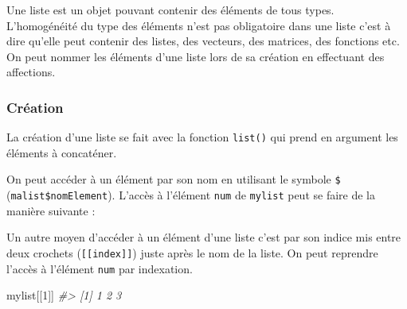 \documentclass[
]{book}
\newenvironment{Shaded}{\begin{snugshade}}{\end{snugshade}}
\newcommand{\AttributeTok}[1]{\textcolor[rgb]{0.77,0.63,0.00}{#1}}
\newcommand{\CommentTok}[1]{\textcolor[rgb]{0.56,0.35,0.01}{\textit{#1}}}
\newcommand{\DecValTok}[1]{\textcolor[rgb]{0.00,0.00,0.81}{#1}}
\newcommand{\FunctionTok}[1]{\textcolor[rgb]{0.00,0.00,0.00}{#1}}
\newcommand{\NormalTok}[1]{#1}
\newcommand{\OtherTok}[1]{\textcolor[rgb]{0.56,0.35,0.01}{#1}}
\newcommand{\SpecialCharTok}[1]{\textcolor[rgb]{0.00,0.00,0.00}{#1}}
\newcommand{\StringTok}[1]{\textcolor[rgb]{0.31,0.60,0.02}{#1}}
\begin{document}
Une liste est un objet pouvant contenir des éléments de tous types. L'homogénéité du type des éléments n'est pas obligatoire dans une liste c'est à dire qu'elle peut contenir des listes, des vecteurs, des matrices, des fonctions etc. On peut nommer les éléments d'une liste lors de sa création en effectuant des affections.

\hypertarget{cruxe9ation-2}{%
\subsubsection*{Création}\label{cruxe9ation-2}}

La création d'une liste se fait avec la fonction \texttt{list()} qui prend en argument les éléments à concaténer.

\begin{Shaded}
\end{Shaded}

On peut accéder à un élément par son nom en utilisant le symbole \texttt{\$} (\texttt{malist\$nomElement}). L'accès à l'élément \texttt{num} de \texttt{mylist} peut se faire de la manière suivante :

\begin{Shaded}
\end{Shaded}

Un autre moyen d'accéder à un élément d'une liste c'est par son indice mis entre deux crochets (\texttt{{[}{[}index{]}{]}}) juste après le nom de la liste. On peut reprendre l'accès à l'élément \texttt{num} par indexation.

\begin{Shaded}
\begin{Highlighting}[]
\NormalTok{mylist[[}\DecValTok{1}\NormalTok{]]}
\CommentTok{\#\textgreater{} [1] 1 2 3}
\end{Highlighting}
\end{Shaded}
\end{document}
